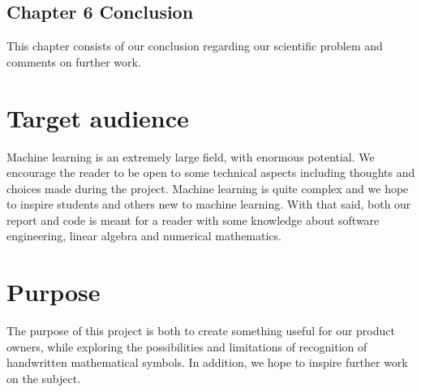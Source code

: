 \subsection{Chapter 6 Conclusion}
This chapter consists of our conclusion regarding our scientific problem and comments on further work.

\section{Target audience}
Machine learning is an extremely large field, with enormous potential. We encourage the reader to be open to some technical aspects including thoughts and choices made during the project. Machine learning is quite complex and we hope to inspire students and others new to machine learning. With that said, both our report and code is meant for a reader with some knowledge about software engineering, linear algebra and numerical mathematics. 

\section{Purpose}
The purpose of this project is both to create something useful for our product owners, while exploring the possibilities and limitations of recognition of handwritten mathematical symbols. In addition, we hope to inspire further work on the subject. 

